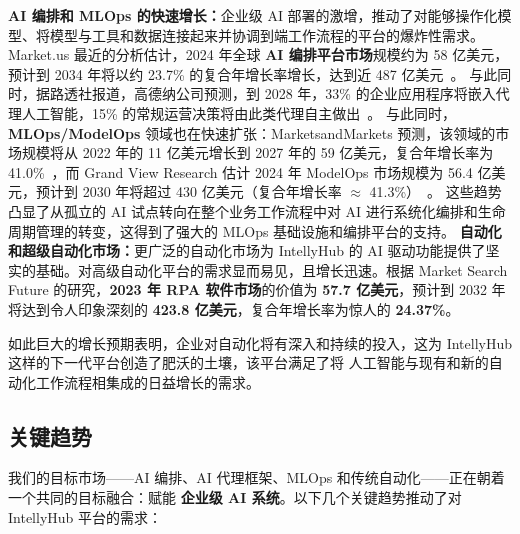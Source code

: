 \documentclass[11点, A4纸, 单面]{article}
\begin{document}
\textbf{AI 编排和 MLOps 的快速增长：}企业级 AI 部署的激增，推动了对能够操作化模型、将模型与工具和数据连接起来并协调到端工作流程的平台的爆炸性需求。
Market.us 最近的分析估计，2024 年全球 \textbf{AI 编排平台市场}规模约为 58 亿美元，预计到 2034 年将以约 23.7\% 的复合年增长率增长，达到近 487 亿美元~\cite{AIOrch}。
与此同时，据路透社报道，高德纳公司预测，到 2028 年，33\% 的企业应用程序将嵌入代理人工智能，15\% 的常规运营决策将由此类代理自主做出~\cite{GartnerAgentic}。
与此同时，\textbf{MLOps/ModelOps} 领域也在快速扩张：MarketsandMarkets 预测，该领域的市场规模将从 2022 年的 11 亿美元增长到 2027 年的 59 亿美元，复合年增长率为 41.0\%~\cite{MLOpsMM}，而 Grand View Research 估计 2024 年 ModelOps 市场规模为 56.4 亿美元，预计到 2030 年将超过 430 亿美元（复合年增长率 $\approx$ 41.3\%）~\cite{ModelOpsGV}。
这些趋势凸显了从孤立的 AI 试点转向在整个业务工作流程中对 AI 进行系统化编排和生命周期管理的转变，这得到了强大的 MLOps 基础设施和编排平台的支持。\newline\newline
\textbf{自动化和超级自动化市场：}更广泛的自动化市场为 IntellyHub 的 AI 驱动功能提供了坚实的基础。对高级自动化平台的需求显而易见，且增长迅速。根据 Market Search Future 的研究，\textbf{2023 年 RPA 软件市场}的价值为 \textbf{57.7 亿美元}，预计到 2032 年将达到令人印象深刻的 \textbf{423.8 亿美元}，复合年增长率为惊人的 \textbf{24.37\%}\cite{mrfRPA}。

如此巨大的增长预期表明，企业对自动化将有深入和持续的投入，这为 IntellyHub 这样的下一代平台创造了肥沃的土壤，该平台满足了将 人工智能与现有和新的自动化工作流程相集成的日益增长的需求。

\subsection{关键趋势}

我们的目标市场——AI 编排、AI 代理框架、MLOps 和传统自动化——正在朝着一个共同的目标融合：赋能 \textbf{企业级 AI 系统}。以下几个关键趋势推动了对 IntellyHub 平台的需求：
\end{document}

